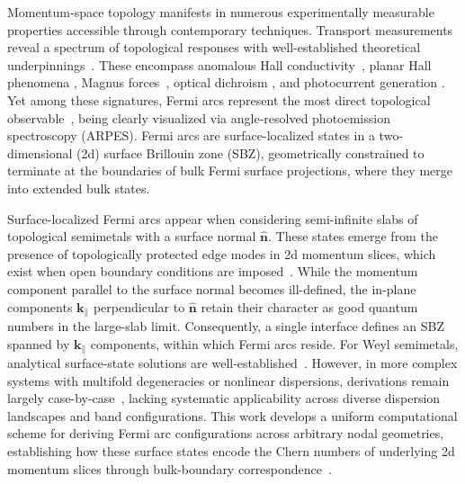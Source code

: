 \documentclass[aps,prb,onecolumn, footinbib, 10pt]{revtex4-2}
\begin{document}
Momentum-space topology manifests in numerous experimentally measurable properties accessible through contemporary techniques. Transport measurements reveal a spectrum of topological responses with well-established theoretical underpinnings~\cite{timm, ips_rahul_ph_strain, *rahul-jpcm, ips-ruiz, ips-tilted, ips-floquet, ips-kush-review, claudia-multifold, ips-rsw-ph, ips-shreya}. These encompass anomalous Hall conductivity~\cite{haldane04_berry, goswami13_axionic, burkov14_anomolous}, planar Hall phenomena \cite{zhang16_linear, chen16_thermoelectric, nandy_2017_chiral, nandy18_Berry, amit_magneto,  pal22a_berry, fu22_thermoelectric, timm, staalhammar20_magneto, yadav23_magneto, ips_rahul_ph_strain, rahul-jpcm, ips-ruiz, ips-tilted, ips-rsw-ph,ips-internode, ips-shreya, ips-spin1-ph, ips-exact-spin1, ips-nl-ph,  claudia-multifold, ips-exact-kwn}, Magnus forces~\cite{papaj_magnus, amit-magnus, ips-magnus}, optical dichroism \cite{ips-cd1, ips_cd}, and photocurrent generation \cite{moore18_optical, guo23_light,kozii, ips_cpge}. Yet among these signatures, Fermi arcs represent the most direct topological observable~\cite{yang_Weyl, lv_Weyl_arc, sanchez, spin1-arc,shroter-arc, Yao2020, multifold-rhsi, quad-weyl-arc}, being clearly visualized via angle-resolved photoemission spectroscopy (ARPES). Fermi arcs are surface-localized states in a two-dimensional (2d) surface Brillouin zone (SBZ), geometrically constrained to terminate at the boundaries of bulk Fermi surface projections, where they merge into extended bulk states.


Surface-localized Fermi arcs appear when considering semi-infinite slabs of topological semimetals with a surface normal $\boldsymbol{\hat n}$. These states emerge from the presence of topologically protected edge modes in 2d momentum slices, which exist when open boundary conditions are imposed~\cite{burkov11_Weyl, hosur1, hosur-review}. While the momentum component parallel to the surface normal becomes ill-defined, the in-plane components $\boldsymbol k_\parallel$ perpendicular to $\boldsymbol{\hat n}$ retain their character as good quantum numbers in the large-slab limit. Consequently, a single interface defines an SBZ spanned by $\boldsymbol k_\parallel$ components, within which Fermi arcs reside. For Weyl semimetals, analytical surface-state solutions are well-established~\cite{witten, hashimoto-arc-weyl, babak-arc-weyl, inti-arc-weyl}. However, in more complex systems with multifold degeneracies or nonlinear dispersions, derivations remain largely case-by-case~\cite{witten, okugawa-arc-weyl, liu-arc-mutiweyl, jafari-arc-weyl, trauzettel-arc-weyl, ewelina-surface-states}, lacking systematic applicability across diverse dispersion landscapes and band configurations. This work develops a uniform computational scheme for deriving Fermi arc configurations across arbitrary nodal geometries, establishing how these surface states encode the Chern numbers of underlying 2d momentum slices through bulk-boundary correspondence~\cite{burkov11_Weyl, hosur1, hosur-review}.
\end{document}

